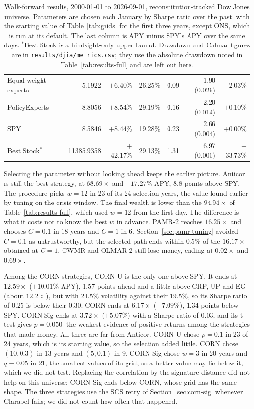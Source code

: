 \documentclass[11pt]{article}
\begin{document}
\begin{table}[h]
{\begin{tabular}{lrrrrrr}
Equal-weight experts   & 5.1922 & $+$6.40\% & 26.25\% & 0.09 & 1.90 (0.029) & $-$2.03\% \\
PolicyExperts          & 8.8056 & $+$8.54\% & 29.19\% & 0.16 & 2.20 (0.014) & $+$0.10\% \\
SPY                    & 8.5846 & $+$8.44\% & 19.28\% & 0.23 & 2.66 (0.004) & $+$0.00\% \\
\midrule
Best Stock$^*$         & 11385.9358 & $+$42.17\% & 29.13\% & 1.31 & 6.97 (0.000) & $+$33.73\% \\
\bottomrule
\end{tabular}%
}
\caption{Walk-forward results, 2000-01-01 to 2026-09-01, reconstitution-tracked
Dow Jones universe. Parameters are chosen each January by Sharpe ratio over
the past, with the starting value of Table~\ref{tab:grids} for the first
three years, except ONS, which is run at its default. The last column is
APY minus SPY's APY over the same days.
$^*$Best Stock is a hindsight-only upper bound. Drawdown and Calmar
figures are in \texttt{results/djia/metrics.csv}; they use the absolute
drawdown noted in Table~\ref{tab:results-full} and are left out here.}
\label{tab:wf-djia}
\end{table}

Selecting the parameter without looking ahead keeps the earlier picture.
Anticor is still the best strategy, at $68.69\times$ and $+17.27\%$ APY,
8.8 points above SPY. The procedure picks $w=12$ in 23 of its 24
selection years, the value found earlier by tuning on the crisis window.
The final wealth is lower than the $94.94\times$ of
Table~\ref{tab:results-full}, which used $w=12$ from the first day. The
difference is what it costs not to know the best $w$ in advance. PAMR-2
reaches $16.25\times$ and chooses $C=0.1$ in 18 years and $C=1$ in 6.
Section~\ref{sec:pamr-tuning} avoided $C=0.1$ as untrustworthy, but the
selected path ends within 0.5\% of the $16.17\times$ obtained at $C=1$.
CWMR and OLMAR-2 still lose money, ending at $0.02\times$ and
$0.69\times$.

Among the CORN strategies, CORN-U is the only one above SPY. It
ends at $12.59\times$ ($+10.01\%$ APY), 1.57 points ahead and a little above
CRP, UP and EG (about $12.2\times$), but with 24.5\% volatility against
their 19.5\%, so its Sharpe ratio of 0.25 is below their 0.30. CORN ends at
$6.17\times$ ($+7.09\%$), 1.34 points below SPY. CORN-Sig ends at
$3.72\times$ ($+5.07\%$) with a Sharpe ratio of 0.03, and its t-test gives
$p=0.050$, the weakest evidence of positive returns among the strategies
that made money. All three are far from Anticor. CORN-U chose $\rho=0.1$ in
23 of 24 years, which is its starting value, so the selection added little.
CORN chose $(10, 0.3)$ in 13 years and $(5, 0.1)$ in 9. CORN-Sig chose $w=3$
in 20 years and $q=0.05$ in 21, the smallest values of its grid, so a better
value may lie below it, which we did not test. Replacing the correlation by
the signature distance did not help on this universe: CORN-Sig ends below
CORN, whose grid has the same shape. The three strategies use the SCS retry
of Section~\ref{sec:corn-sig} whenever Clarabel fails; we did not count how
often that happened.
\end{document}
